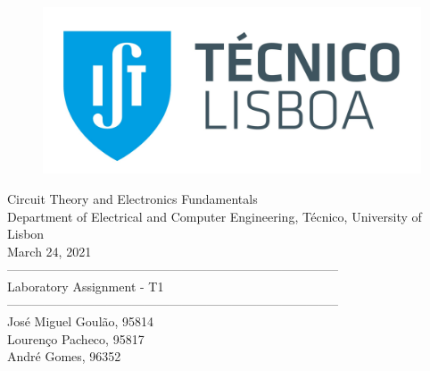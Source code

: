 \thispagestyle {empty}


\begin{figure}[h]
	\centering
	\includegraphics[width = 0.5\linewidth]{ist_foto}
\end{figure}

\begin{center}

\vspace{2cm}
{\FontLb Circuit Theory and Electronics Fundamentals} \\

\vspace{0.5cm}
{\FontSn Department of Electrical and Computer Engineering, Técnico, University of Lisbon} \\

\vspace{0.5cm}
{\FontSn March 24, 2021} \\

\vspace{1cm}
{\FontSn --------------------------------------------------------------------------------} \\
\vspace{0.1cm}
{\FontLb Laboratory Assignment - T1} \\
{\FontSn --------------------------------------------------------------------------------} \\

\vspace{1cm}
{\FontSn José Miguel Goulão, 95814} \\
{\FontSn Lourenço Pacheco, 95817} \\
{\FontSn André Gomes, 96352} \\

\vspace{0.5cm}

\end{center}

